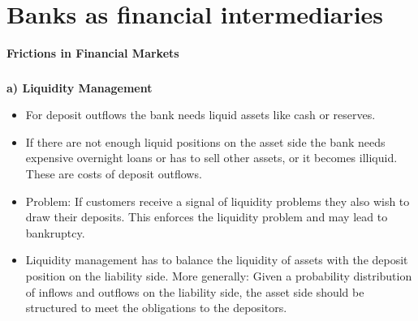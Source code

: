 \documentclass[11pt]{beamer}
\begin{document}
%
\section{Banks as financial intermediaries}
%


\begin{frame}
  \begin{center}
    {\Large \textbf{Frictions in Financial Markets}}
  \end{center}
\end{frame}

\begin{frame}
\frametitle{\insertsection}

\textbf{a) Liquidity Management}

\begin{itemize}
\item For deposit outflows the bank needs liquid assets like cash or reserves.

\item If there are not enough liquid positions on the asset side the bank needs expensive overnight loans or has to sell other assets, or it becomes illiquid. These are costs of deposit outflows.

\item Problem: If customers receive a signal of liquidity problems they also wish to draw their deposits. This enforces the liquidity problem and may lead to bankruptcy.

\item Liquidity management has to balance the liquidity of assets with the deposit position on the liability side. More generally: Given a probability distribution of inflows and outflows on the liability side, the asset side should be structured to meet the obligations to the depositors.
\end{itemize}
\end{frame}

\end{document}
